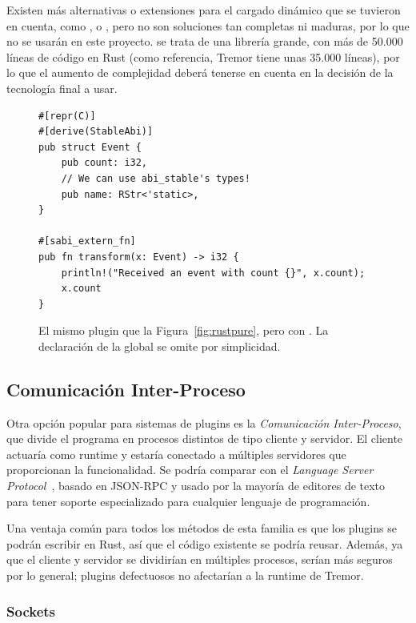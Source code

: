 Existen más alternativas o extensiones para el cargado dinámico que se tuvieron
en cuenta, como ,  o , pero
no son soluciones tan completas ni maduras, por lo que no se usarán en este
proyecto. \abistable se trata de una librería grande, con más de 50.000 líneas
de código en Rust (como referencia, Tremor tiene unas 35.000 líneas), por lo que
el aumento de complejidad deberá tenerse en cuenta en la decisión de la
tecnología final a usar.

\begin{figure}
    \centering
    \begin{verbatim}
#[repr(C)]
#[derive(StableAbi)]
pub struct Event {
    pub count: i32,
    // We can use abi_stable's types!
    pub name: RStr<'static>,
}

#[sabi_extern_fn]
pub fn transform(x: Event) -> i32 {
    println!("Received an event with count {}", x.count);
    x.count
}
    \end{verbatim}

    \caption{El mismo plugin que la Figura~\ref{fig:rustpure}, pero con
        \abistable. La declaración de la global  se omite por
        simplicidad.}%
    \label{fig:rustabi_stable}
\end{figure}

\subsection{Comunicación Inter-Proceso}

Otra opción popular para sistemas de plugins es la \emph{Comunicación
Inter-Proceso}, que divide el programa en procesos distintos de tipo cliente y
servidor. El cliente actuaría como runtime y estaría conectado a múltiples
servidores que proporcionan la funcionalidad. Se podría comparar con el
\emph{Language Server Protocol}~\cite{lsp}, basado en JSON-RPC y usado por la
mayoría de editores de texto para tener soporte especializado para cualquier
lenguaje de programación.

Una ventaja común para todos los métodos de esta familia es que los plugins se
podrán escribir en Rust, así que el código existente se podría reusar. Además,
ya que el cliente y servidor se dividirían en múltiples procesos, serían más
seguros por lo general; plugins defectuosos no afectarían a la runtime de
Tremor.

\subsubsection{Sockets}


